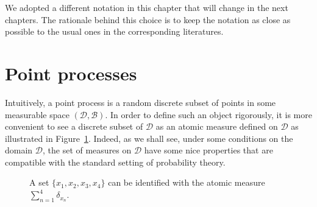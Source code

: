 \documentclass[twoside,11pt]{book}
\numberwithin{theorem}{chapter}
\numberwithin{definition}{chapter}
\numberwithin{proposition}{chapter}
\numberwithin{corollary}{chapter}
\numberwithin{example}{chapter}
\numberwithin{lemma}{chapter}
\numberwithin{assumption}{chapter}
\numberwithin{equation}{chapter}
\numberwithin{figure}{chapter}
\begin{document}
We adopted a different notation in this chapter that will change in the next chapters. The rationale behind this choice is to keep the notation as close as possible to the usual ones in the corresponding literatures.





\section{Point processes}\label{sec:pointprocesses}

Intuitively, a point process is a random discrete subset of points in some  measurable space $(\mathcal{D}, \mathcal{B})$. In order to define such an object rigorously, it is more convenient to see a discrete subset of $\mathcal{D}$ as an atomic measure defined on $\mathcal{D}$ as illustrated in Figure~\ref{fig:pointprocess}. Indeed, as we shall see, under some conditions on the domain $\mathcal{D}$, the set of measures on $\mathcal{D}$ have some nice properties that are compatible with the standard setting of probability theory. 


\begin{figure}[]
\centering

 \caption{ A set $\{x_1, x_{2}, x_{3}, x_{4}\}$ can be identified with the atomic measure $\sum\limits_{n =1}^{4}\delta_{x_n}$. \label{fig:pointprocess}}
\end{figure}





\end{document}
